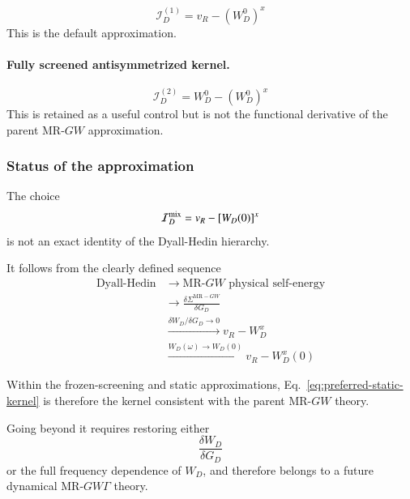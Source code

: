 \documentclass[aip,jcp,reprint,noshowkeys,superscriptaddress]{revtex4-1}
\begin{document}
\begin{equation}
  \mathcal I_D^{(1)}
  =
  v_R-(W_D^0)^x
  \label{eq:preferred-static-kernel}
\end{equation}
This is the default approximation.

\paragraph{Fully screened antisymmetrized kernel.}

\begin{equation}
  \mathcal I_D^{(2)}
  =
  W_D^0-(W_D^0)^x
\end{equation}
This is retained as a useful control but is not the functional
derivative of the parent MR-$GW$ approximation.


\subsubsection{Status of the approximation}

The choice
\begin{equation}
  \mathcal I_D^{\rm mix}
  =
  v_R-[W_D(0)]^x
\end{equation}
is not an exact identity of the Dyall-Hedin hierarchy.

It follows from the clearly defined sequence
\begin{equation}
  \begin{aligned}
  \text{Dyall-Hedin}
  &\longrightarrow
  \text{MR-}GW\text{ physical self-energy}
  \\
  &\longrightarrow
  \frac{\delta\Sigma^{\mathrm{MR-}GW}}{\delta G_D}
  \\
  &\xrightarrow{\delta W_D/\delta G_D\to0}
  v_R-W_D^x
  \\
  &\xrightarrow{W_D(\omega)\to W_D(0)}
  v_R-W_D^x(0)
  \end{aligned}
  \label{eq:kernel-derivation-summary}
\end{equation}

Within the frozen-screening and static approximations,
Eq.~\eqref{eq:preferred-static-kernel} is therefore the kernel
consistent with the parent MR-$GW$ theory.

Going beyond it requires restoring either
\begin{equation}
  \frac{\delta W_D}{\delta G_D}
\end{equation}
or the full frequency dependence of $W_D$, and therefore belongs to a
future dynamical MR-$GW\Gamma$ theory.
\end{document}

